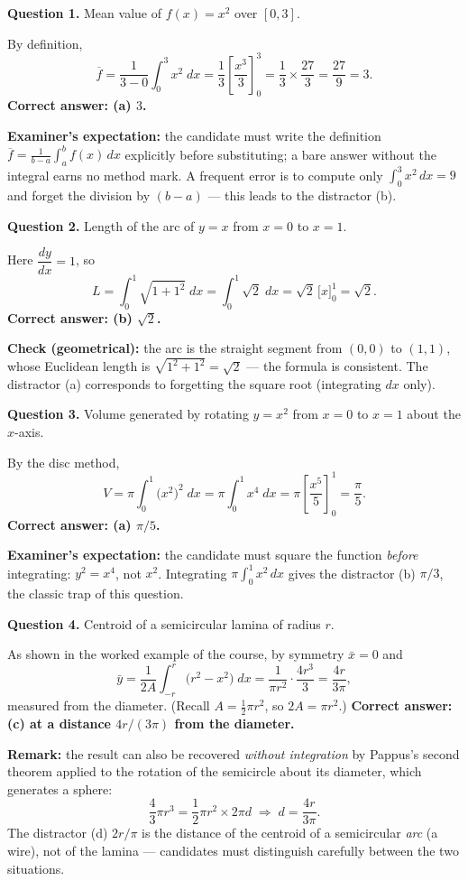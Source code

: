 \documentclass[11pt]{article}
\begin{document}
\begin{corrige}
\textbf{Question 1.} Mean value of $f(x)=x^{2}$ over $[0,3]$.

By definition,
\[
\overline{f} = \frac{1}{3-0}\int_{0}^{3} x^{2}\;dx = \frac{1}{3}\left[\frac{x^{3}}{3}\right]_{0}^{3} = \frac{1}{3}\times\frac{27}{3} = \frac{27}{9} = 3.
\]
\textbf{Correct answer: (a) $3$.}

\textbf{Examiner's expectation:} the candidate must write the definition $\overline{f}=\frac{1}{b-a}\int_{a}^{b}f(x)\,dx$ explicitly before substituting; a bare answer without the integral earns no method mark. A frequent error is to compute only $\int_{0}^{3}x^{2}\,dx=9$ and forget the division by $(b-a)$ — this leads to the distractor (b).

\textbf{Question 2.} Length of the arc of $y=x$ from $x=0$ to $x=1$.

Here $\dfrac{dy}{dx}=1$, so
\[
L = \int_{0}^{1}\sqrt{1+1^{2}}\;dx = \int_{0}^{1}\sqrt{2}\;dx = \sqrt{2}\,\bigl[x\bigr]_{0}^{1} = \sqrt{2}.
\]
\textbf{Correct answer: (b) $\sqrt{2}$.}

\textbf{Check (geometrical):} the arc is the straight segment from $(0,0)$ to $(1,1)$, whose Euclidean length is $\sqrt{1^{2}+1^{2}}=\sqrt{2}$ — the formula is consistent. The distractor (a) corresponds to forgetting the square root (integrating $dx$ only).

\textbf{Question 3.} Volume generated by rotating $y=x^{2}$ from $x=0$ to $x=1$ about the $x$-axis.

By the disc method,
\[
V = \pi\int_{0}^{1} \bigl(x^{2}\bigr)^{2}\;dx = \pi\int_{0}^{1} x^{4}\;dx = \pi\left[\frac{x^{5}}{5}\right]_{0}^{1} = \frac{\pi}{5}.
\]
\textbf{Correct answer: (a) $\pi/5$.}

\textbf{Examiner's expectation:} the candidate must square the function \emph{before} integrating: $y^{2}=x^{4}$, not $x^{2}$. Integrating $\pi\int_{0}^{1}x^{2}\,dx$ gives the distractor (b) $\pi/3$, the classic trap of this question.

\textbf{Question 4.} Centroid of a semicircular lamina of radius $r$.

As shown in the worked example of the course, by symmetry $\bar{x}=0$ and
\[
\bar{y} = \frac{1}{2A}\int_{-r}^{r}\bigl(r^{2}-x^{2}\bigr)\;dx
= \frac{1}{\pi r^{2}}\cdot\frac{4r^{3}}{3} = \frac{4r}{3\pi},
\]
measured from the diameter. (Recall $A=\tfrac12\pi r^{2}$, so $2A=\pi r^{2}$.)
\textbf{Correct answer: (c) at a distance $4r/(3\pi)$ from the diameter.}

\textbf{Remark:} the result can also be recovered \emph{without integration} by Pappus's second theorem applied to the rotation of the semicircle about its diameter, which generates a sphere:
\[
\frac{4}{3}\pi r^{3} = \frac{1}{2}\pi r^{2}\times 2\pi d \;\Longrightarrow\; d=\frac{4r}{3\pi}.
\]
The distractor (d) $2r/\pi$ is the distance of the centroid of a semicircular \emph{arc} (a wire), not of the lamina — candidates must distinguish carefully between the two situations.
\end{corrige}
\end{document}
